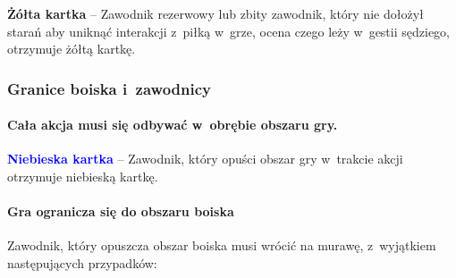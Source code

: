\documentclass[12pt]{article}
\newcommand\yellowcard[1]{\bgroup\textcolor{darkyellow}{\textbf{#1}}}
\newcommand\bluecard[1]{\bgroup\textcolor{blue}{\textbf{#1}}}
\begin{document}
\yellowcard{Żółta kartka} -- Zawodnik rezerwowy lub zbity zawodnik, który nie
dołożył starań aby uniknąć interakcji z~piłką w~grze, ocena czego leży w~gestii sędziego, otrzymuje żółtą kartkę.

\subsubsection{Granice boiska i~zawodnicy}

\paragraph{Cała akcja musi się odbywać w~obrębie obszaru gry.}

\bluecard{Niebieska kartka} -- Zawodnik, który opuści obszar gry w~trakcie
akcji otrzymuje niebieską kartkę.

\paragraph{Gra ogranicza się do obszaru boiska}
Zawodnik, który
opuszcza obszar boiska musi wrócić na murawę, z~wyjątkiem następujących
przypadków:
\end{document}
